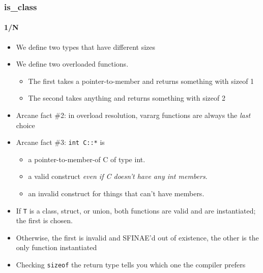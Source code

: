 \begin{frame}[fragile,t]
\frametitle{is\_class}
\framesubtitle{1/N}
\begin{itemize}[<+->]
\item We define two types that have different sizes
\item We define two overloaded functions.
\begin{itemize}
  \item The first takes a pointer-to-member and returns something with sizeof 1
  \item The second takes anything and returns something with sizeof 2
\end{itemize}
\item Arcane fact \#2: in overload resolution, vararg functions are
  always the \emph{last} choice
\item Arcane fact \#3: \texttt{int C::*} is 
\begin{itemize}
  \item a pointer-to-member-of C of type int.
  \item a valid construct \emph{even if C doesn't have any int members}.
  \item an invalid construct for things that can't have members.
\end{itemize}
\item If \texttt{T} is a class, struct, or union, both functions are
  valid and are instantiated; the first is chosen.
\item Otherwise, the first is invalid and SFINAE'd out of existence,
  the other is the only function instantiated
\item Checking \texttt{sizeof} the return type tells you which one the
  compiler prefers

\end{itemize}


\end{frame}

